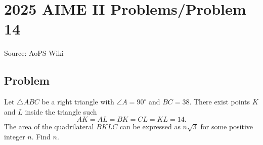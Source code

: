 \documentclass[12pt]{article}
\begin{document}
\section*{{2025 AIME II Problems/Problem 14}}
Source: AoPS Wiki

\subsection*{Problem}
Let ${\triangle ABC}$ be a right triangle with $\angle A = 90^\circ$ and $BC = 38.$ There exist points $K$ and $L$ inside the triangle such \[AK = AL = BK = CL = KL = 14.\] The area of the quadrilateral $BKLC$ can be expressed as $n\sqrt3$ for some positive integer $n.$ Find $n.$
\end{document}
